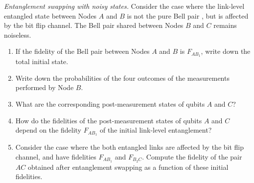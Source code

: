 \begin{exercise}
\emph{Entanglement swapping with noisy states.} Consider the case where the link-level entangled state between Nodes $A$ and $B$ is not the pure Bell pair \ket{\Phi^+}, but is affected by the bit flip channel. The Bell pair shared between Nodes $B$ and $C$ remains noiseless.
\begin{enumerate}[label=(\alph*)]
    \item If the fidelity of the Bell pair between Nodes $A$ and $B$ is $F_{AB_1}$, write down the total initial state.
    \item Write down the probabilities of the four outcomes of the measurements performed by Node $B$.
    \item What are the corresponding post-measurement states of qubits $A$ and $C$?
    \item How do the fidelities of the post-measurement states of qubits $A$ and $C$ depend on the fidelity $F_{AB_1}$ of the initial link-level entanglement? 
    \item Consider the case where the both entangled links are affected by the bit flip channel, and have fidelities $F_{AB_1}$ and $F_{B_2C}$. Compute the fidelity of the pair $AC$ obtained after entanglement swapping as a function of these initial fidelities.
\end{enumerate}
\end{exercise}
